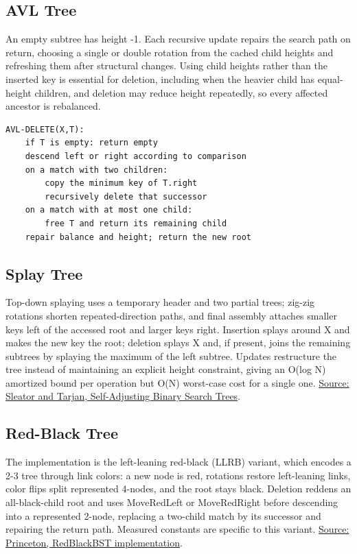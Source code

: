 \subsection{AVL Tree}

An empty subtree has height -1. Each recursive update repairs the search path on return, choosing a single or double rotation from the cached child heights and refreshing them after structural changes. Using child heights rather than the inserted key is essential for deletion, including when the heavier child has equal-height children, and deletion may reduce height repeatedly, so every affected ancestor is rebalanced.

\begin{lstlisting}[language={},numbers=none]
AVL-DELETE(X,T):
    if T is empty: return empty
    descend left or right according to comparison
    on a match with two children:
        copy the minimum key of T.right
        recursively delete that successor
    on a match with at most one child:
        free T and return its remaining child
    repair balance and height; return the new root
\end{lstlisting}

\subsection{Splay Tree}

Top-down splaying uses a temporary header and two partial trees; zig-zig rotations shorten repeated-direction paths, and final assembly attaches smaller keys left of the accessed root and larger keys right. Insertion splays around X and makes the new key the root; deletion splays X and, if present, joins the remaining subtrees by splaying the maximum of the left subtree. Updates restructure the tree instead of maintaining an explicit height constraint, giving an O(log N) amortized bound per operation but O(N) worst-case cost for a single one. \href{https://www.cs.cmu.edu/~sleator/papers/Self-Adjusting.htm}{Source: Sleator and Tarjan, Self-Adjusting Binary Search Trees}.

\subsection{Red-Black Tree}

The implementation is the left-leaning red-black (LLRB) variant, which encodes a 2-3 tree through link colors: a new node is red, rotations restore left-leaning links, color flips split represented 4-nodes, and the root stays black. Deletion reddens an all-black-child root and uses MoveRedLeft or MoveRedRight before descending into a represented 2-node, replacing a two-child match by its successor and repairing the return path. Measured constants are specific to this variant. \href{https://algs4.cs.princeton.edu/code/edu/princeton/cs/algs4/RedBlackBST.java.html}{Source: Princeton, RedBlackBST implementation}.

